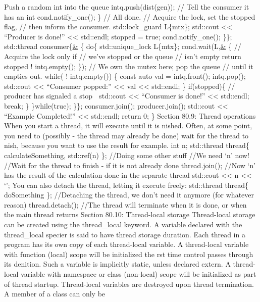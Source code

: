 Push a random int into the queue intq.push(dist(gen)); // Tell the
consumer it has an int cond.notify\_one(); \} // All done. // Acquire
the lock, set the stopped flag, // then inform the consumer.
std::lock\_guard L\{mtx\}; std::cout \textless\textless{} ``Producer is
done!'' \textless\textless{} std::endl; stopped = true;
cond.notify\_one(); \}\}; std::thread consumer\{\href{}{\&} \{ do\{
std::unique\_lock L\{mtx\}; cond.wait(L,\href{}{\&} \{ // Acquire the
lock only if // we've stopped or the queue // isn't empty return stopped
\textbar\textbar{} ! intq.empty(); \}); // We own the mutex here; pop
the queue // until it empties out. while( ! intq.empty()) \{ const auto
val = intq.front(); intq.pop(); std::cout \textless\textless{}
``Consumer popped:'' \textless\textless{} val \textless\textless{}
std::endl; \} if(stopped)\{ // producer has signaled a stop  std::cout
\textless\textless{} ``Consumer is done!'' \textless\textless{}
std::endl; break; \} \}while(true); \}\}; consumer.join();
producer.join(); std::cout \textless\textless{} ``Example Completed!''
\textless\textless{} std::endl; return 0; \} Section 80.9: Thread
operations When you start a thread, it will execute until it is nished.
Often, at some point, you need to (possibly - the thread may already be
done) wait for the thread to nish, because you want to use the result
for example. int n; std::thread thread\{ calculateSomething, std::ref(n)
\}; //Doing some other stuff //We need `n' now! //Wait for the thread to
finish - if it is not already done thread.join(); //Now `n' has the
result of the calculation done in the separate thread std::cout
\textless\textless{} n \textless\textless{} `\n'; You can also detach
the thread, letting it execute freely: std::thread thread\{ doSomething
\}; //Detaching the thread, we don't need it anymore (for whatever
reason) thread.detach(); //The thread will terminate when it is done, or
when the main thread returns Section 80.10: Thread-local storage
Thread-local storage can be created using the thread\_local keyword. A
variable declared with the thread\_local specier is said to have thread
storage duration. Each thread in a program has its own copy of each
thread-local variable. A thread-local variable with function (local)
scope will be initialized the rst time control passes through its
denition. Such a variable is implicitly static, unless declared extern.
A thread-local variable with namespace or class (non-local) scope will
be initialized as part of thread startup. Thread-local variables are
destroyed upon thread termination. A member of a class can only be
